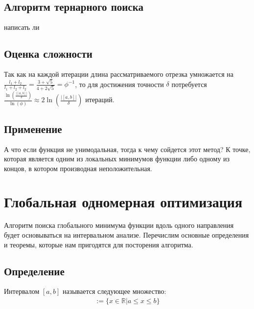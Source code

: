 \documentclass{article}
\begin{document}
    \subsection{Алгоритм тернарного поиска}
    написать ли

    \subsection{Оценка сложности}
    Так как на каждой итерации длина рассматриваемого отрезка умножается на $\frac{l_1+l_2}{l_1+l_2+l_2}=\frac{3+\sqrt{5}}{4+2\sqrt{5}}=\phi^{-1}$, то для достижения точности $\delta$ потребуется $\frac{\ln(\frac{|[a, b]|}{\delta})}{\ln(\phi)} \approx 2\ln(\frac{|[a, b]|}{\delta})$ итераций.

    \subsection{Применение}
    А что если функция не унимодальная, тогда к чему сойдется этот метод? К точке, которая является одним из локальных минимумов функции либо одному из концов, в котором производная неположительная.\\









    \newpage
    \section{Глобальная одномерная оптимизация}
    Алгоритм поиска глобального минимума функции вдоль одного направления будет основываться на интервальном анализе. Перечислим основные определения и теоремы, которые нам пригодятся для посторения алгоритма.

    \subsection{Определение}
    Интервалом $[a, b]$ называется следующее множество:
    \begin{gather*}
    [a,b]
        :=\{x \in \mathbb{R} | a \le x \le b\}
    \end{gather*}
\end{document}
